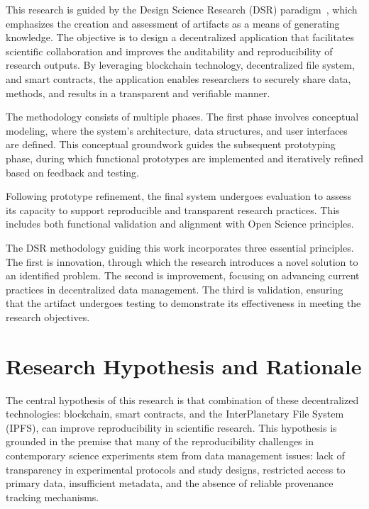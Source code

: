 \documentclass[final]{rc-book-2.14}
\begin{document}
This research is guided by the Design Science Research (DSR) paradigm~\cite{hevner2004design}, which emphasizes the creation and assessment of artifacts as a means of generating knowledge. The objective is to design a decentralized application that facilitates scientific collaboration and improves the auditability and reproducibility of research outputs. By leveraging blockchain technology, decentralized file system, and smart contracts, the application enables researchers to securely share data, methods, and results in a transparent and verifiable manner.

The methodology consists of multiple phases. The first phase involves conceptual modeling, where the system’s architecture, data structures, and user interfaces are defined. This conceptual groundwork guides the subsequent prototyping phase, during which functional prototypes are implemented and iteratively refined based on feedback and testing.

Following prototype refinement, the final system undergoes evaluation to assess its capacity to support reproducible and transparent research practices. This includes both functional validation and alignment with Open Science principles.

The DSR methodology guiding this work incorporates three essential principles. The first is innovation, through which the research introduces a novel solution to an identified problem. The second is improvement, focusing on advancing current practices in decentralized data management. The third is validation, ensuring that the artifact undergoes  testing to demonstrate its effectiveness in meeting the research objectives.


\section{Research Hypothesis and Rationale}
\label{chp:intro:sec:res_hyp}


The central hypothesis of this research is that combination of these decentralized technologies: blockchain, smart contracts, and the InterPlanetary File System (IPFS), can improve reproducibility in scientific research. This hypothesis is grounded in the premise that many of the reproducibility challenges in contemporary science experiments stem from data management issues: lack of transparency in experimental protocols and study designs, restricted access to primary data, insufficient metadata, and the absence of reliable provenance tracking mechanisms. 
\end{document}
